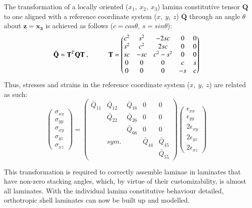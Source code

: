 The transformation of a locally oriented ($x_1,\ x_2,\ x_3$) lamina constitutive tensor $\mathbf{Q}$ to one aligned with a reference coordinate system ($x,\ y,\ z$) $\bar{\mathbf{Q}}$ through an angle $\theta$ about $\mathbf{z}=\mathbf{x_3}$ is achieved as follows ($c = cos\theta,\ s = sin\theta$):
\begin{equation} 
\bar{\mathbf{Q}} = \mathbf{T}^T \mathbf{Q} \mathbf{T}\ ,
\hspace{10mm}
\mathbf{T} =
\begin{pmatrix}
c^2 & s^2 & -2sc & 0 & 0 \\
s^2 & c^2 & 2sc & 0 & 0 \\
sc & -sc & c^2 - s^2 & 0 & 0 \\
0 & 0 & 0 & c & s \\
 0 & 0 & 0 & -s & c
\end{pmatrix}
\label{eqscomp11}
\end{equation}
Thus, stresses and strains in the reference coordinate system  ($x,\ y,\ z$) are related as such:
\begin{equation} 
\begin{pmatrix}
\sigma_{xx} \\
\sigma_{yy} \\
\sigma_{xy} \\
\sigma_{yz} \\
\sigma_{xz} 
\end{pmatrix}
=
\begin{pmatrix}
\bar{Q}_{11} & \bar{Q}_{12} &  \bar{Q}_{16} & 0 & 0 \\
\  & \bar{Q}_{22} &  \bar{Q}_{26} & 0 & 0 \\
\  & \  & \bar{Q}_{66}  & 0 & 0 \\
\  & sym. & \  & \bar{Q}_{44} & \bar{Q}_{45} \\
\  & \  & \  & \ & \bar{Q}_{55}
\end{pmatrix}
\begin{pmatrix}
\epsilon_{xx} \\
\epsilon_{yy} \\
2\epsilon_{xy}\\
2\epsilon_{yz} \\
2\epsilon_{xz}
\end{pmatrix}
\label{eqscomp_plane_stress_tensor_rotated}
\end{equation}

This transformation is required to correctly assemble laminae in laminates that have non-zero stacking angles, which, by virtue of their customizability, is almost all laminates. With the individual lamina constitutive behaviour detailed, orthotropic shell laminates can now be built up and modelled.

